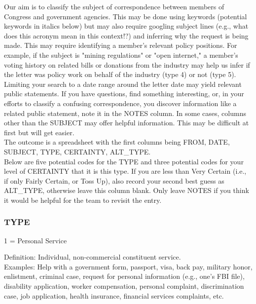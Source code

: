 \documentclass[12pt]{article}
\begin{document}
Our aim is to classify the subject of correspondence between members of Congress and government agencies. This may be done using keywords (potential keywords in italics below) but may also require googling subject lines (e.g., what does this acronym mean in this context!?) and inferring why the request is being made. This may require identifying a member's relevant policy positions. For example, if the subject is "mining regulations" or "open internet," a member's voting history on related bills or donations from the industry may help us infer if the letter was policy work on behalf of the industry (type 4) or not (type 5). Limiting your search to a date range around the letter date may yield relevant public statements. If you have questions, find something interesting, or, in your efforts to classify a confusing correspondence, you discover information like a related public statement, note it in the NOTES column. In some cases, columns other than the SUBJECT may offer helpful information. This may be difficult at first but will get easier. \\

The outcome is a spreadsheet with the first columns being FROM, DATE, SUBJECT, TYPE, CERTAINTY, ALT\_TYPE.\\


Below are five potential codes for the TYPE and three potential codes for your level of CERTAINTY that it is this type. If you are less than Very Certain (i.e., if only Fairly Certain, or Toss Up), also record your second best guess as ALT\_TYPE, otherwise leave this column blank. Only leave NOTES if you think it would be helpful for the team to revisit the entry.

\subsubsection{TYPE}

1 = Personal Service\\

\hfill\begin{minipage}{\dimexpr\textwidth-2cm}
Definition: Individual, non-commercial constituent service.\\
Examples: Help with a government form, passport, visa, back pay, military honor, enlistment, criminal case, request for personal information (e.g., one’s FBI file), disability application, worker compensation, personal complaint, discrimination case, job application, health insurance, financial services complaints, etc.\\
\end{minipage}
\end{document}
